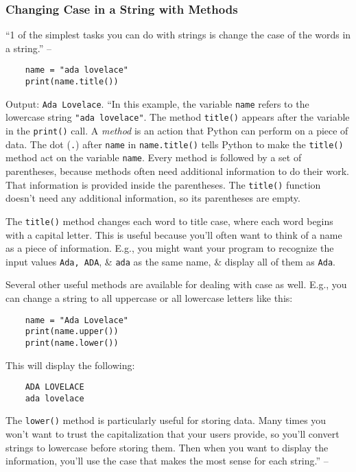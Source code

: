 \documentclass[oneside]{book}
\numberwithin{equation}{section}
\begin{document}
\subsubsection{Changing Case in a String with Methods}
``1 of the simplest tasks you can do with strings is change the case of the words in a string.'' -- \cite[p. 20]{Matthes2019}
\begin{verbatim}
	name = "ada lovelace"
	print(name.title())
\end{verbatim}
Output: \texttt{Ada Lovelace}. ``In this example, the variable \texttt{name} refers to the lowercase string \texttt{"ada lovelace"}. The method \texttt{title()} appears after the variable in the \texttt{print()} call. A \textit{method} is an action that Python can perform on a piece of data. The dot (\texttt{.}) after \texttt{name} in \texttt{name.title()} tells Python to make the \texttt{title()} method act on the variable \texttt{name}. Every method is followed by a set of parentheses, because methods often need additional information to do their work. That information is provided inside the parentheses. The \texttt{title()} function doesn't need any additional information, so its parentheses are empty.

The \texttt{title()} method changes each word to title case, where each word begins with a capital letter. This is useful because you'll often want to think of a name as a piece of information. E.g., you might want your program to recognize the input values \texttt{Ada, ADA}, \& \texttt{ada} as the same name, \& display all of them as \texttt{Ada}.

Several other useful methods are available for dealing with case as well. E.g., you can change a string to all uppercase or all lowercase letters like this:
\begin{verbatim}
	name = "Ada Lovelace"
	print(name.upper())
	print(name.lower())
\end{verbatim}
This will display the following:
\begin{verbatim}
	ADA LOVELACE
	ada lovelace
\end{verbatim}
The \texttt{lower()} method is particularly useful for storing data. Many times you won't want to trust the capitalization that your users provide, so you'll convert strings to lowercase before storing them. Then when you want to display the information, you'll use the case that makes the most sense for each string.'' -- \cite[p. 20]{Matthes2019}
\end{document}
